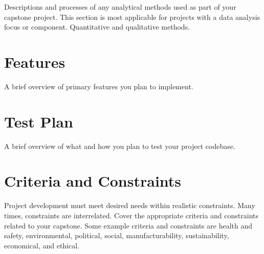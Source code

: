 Descriptions and processes of any analytical methods used as part of your capstone project. This section is most applicable for projects with a data analysis focus or component. Quantitative and qualitative methods.




\section{Features}

A brief overview of primary features you plan to implement.




\section{Test Plan}

A brief overview of what and how you plan to test your project codebase.




\section{Criteria and Constraints}

Project development must meet desired needs within realistic constraints. Many times, constraints are interrelated. Cover the appropriate criteria and constraints related to your capstone. Some example criteria and constraints are health and safety, environmental, political, social, manufacturability, sustainability, economical, and ethical.

